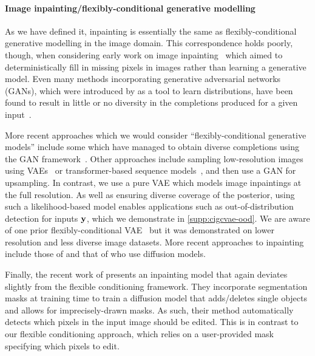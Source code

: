 \paragraph{Image inpainting/flexibly-conditional generative modelling}
As we have defined it, inpainting is essentially the same as flexibly-conditional generative modelling in the image domain. 
This correspondence holds poorly, though, when considering early work on image inpainting~\citep{bertalmio2000image,bertalmio2001navier,ballester2001filling,levin2003learning,criminisi2003object,kohler2014mask,ren2015shepard} which aimed to deterministically fill in missing pixels in images rather than learning a generative model.
Even many methods incorporating generative adversarial networks (GANs), which
were introduced by \citet{goodfellow2014generative} as a tool to learn
distributions, have been found to result in little or no diversity in the
completions produced for a given
input~\citep{song2018spg,yu2018generative,yu2019free,pathak2016context,iizuka2017globally}.

More recent approaches which we would consider ``flexibly-conditional generative models'' include some which have managed to obtain diverse completions using
the GAN framework~\citep{zhao2020uctgan,zhao2021large,liu2021pd}.
%
Other approaches include sampling low-resolution images using
VAEs~\citep{zheng2019pluralistic,peng2021generating} or transformer-based
sequence models~\citep{zheng2021tfill,wan2021high}, and then use a GAN for
upsampling. In contrast, we use a pure VAE which models image inpaintings at the full
resolution. As well as ensuring diverse coverage of the posterior, using such a
likelihood-based model enables applications such as out-of-distribution
detection for inputs ${\mathbf{y}}$, which we demonstrate in \cref{supp:cigcvae-ood}. We are aware of one prior flexibly-conditional VAE~\citep{ivanov2018variational} but it was demonstrated on lower resolution and less diverse image datasets. More recent approaches to inpainting include those of \citet{song2020score} and that of \citet{tian2023control} who use diffusion models.

Finally, the recent work of \citet{xie2023smartbrush} presents an inpainting model that again deviates slightly from the flexible conditioning framework. They incorporate segmentation masks at training time to train a diffusion model that adds/deletes single objects and allows for imprecisely-drawn masks. As such, their method automatically detects which pixels in the input image should be edited. This is in contrast to our flexible conditioning approach, which relies on a user-provided mask specifying which pixels to edit. 



